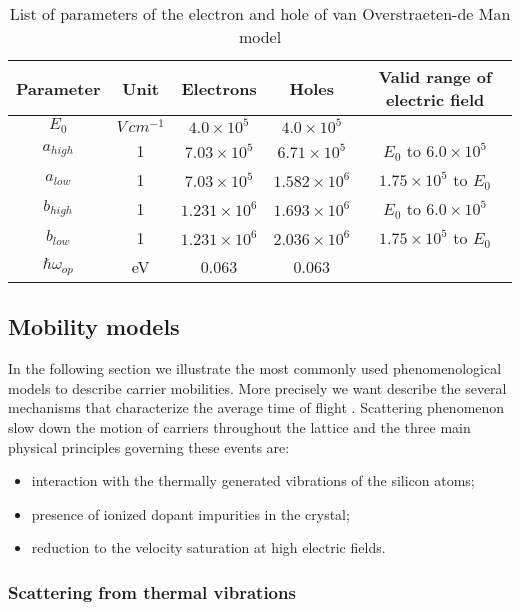 \begin{table}[!h]
\centering
\begin{tabular}{ccccc}
\toprule
Parameter & Unit & Electrons & Holes  & Valid range of electric field\\
\midrule
$E_0$ & $V \, cm^{-1}$ & $4.0 \times 10^{5}$ & $4.0 \times 10^{5}$ & \\
$a_{high}$ & 1 & $7.03 \times 10^{5}$ & $6.71 \times 10^{5}$ & $E_0$ to $6.0 \times 10^{5}$\\
$a_{low}$ & 1 & $7.03 \times 10^{5}$ & $1.582 \times 10^{6}$ & $1.75 \times 10^{5}$ to $E_0$\\
$b_{high}$ & 1 & $1.231 \times 10^{6}$ & $1.693 \times 10^{6}$ & $E_0$ to $6.0 \times 10^{5}$\\
$b_{low}$ & 1 & $1.231 \times 10^{6}$ & $2.036 \times 10^{6}$ &$1.75 \times 10^{5}$ to $E_0$\\
$\hbar\omega_{op}$ & eV & 0.063 & 0.063\\
\bottomrule
\end{tabular}
\caption{List of parameters of the electron and hole of van Overstraeten-de Man model}
\end{table}

\clearpage 

\subsection{Mobility models}

In the following section we illustrate the most commonly used phenomenological models to describe carrier mobilities. More precisely we want describe  the several mechanisms that characterize the average time of flight .
Scattering phenomenon slow down the motion of carriers throughout the lattice and the three main physical principles governing these events are:
\begin{itemize}
\item interaction with the thermally generated vibrations of the silicon atoms;
\item presence of ionized dopant impurities in the crystal;
\item reduction to the velocity saturation at high electric fields.
\end{itemize}

\subsubsection{Scattering from thermal vibrations}


